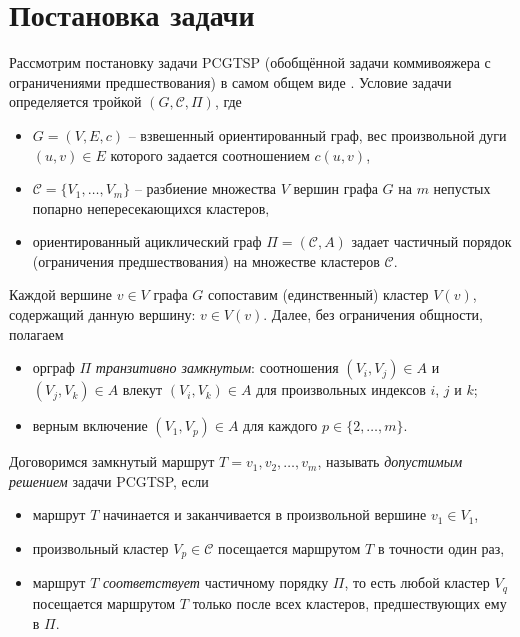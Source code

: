 
\section*{Постановка задачи}
\label{sec:pcgtsp-stmt}

Рассмотрим постановку задачи PCGTSP
(обобщённой задачи коммивояжера с ограничениями предшествования)
в самом общем виде
\cite{bi:pcgtsp2021}.
Условие задачи определяется тройкой
$(G,\mathcal C,\Pi)$,
где
\begin{itemize}
  \item
	$G=(V,E,c)$
  -- взвешенный ориентированный граф,
  вес произвольной дуги $(u,v)\in E$
  которого задается соотношением
  $c(u,v)$,
  \item
	$\mathcal C=\{V_1,\ldots,V_m\}$
  -- разбиение множества $V$
  вершин графа $G$ на $m$
  непустых попарно непересекающихся кластеров,
  \item
	ориентированный ациклический граф
  $ \Pi = (\mathcal C, A) $
  задает частичный порядок
  (ограничения предшествования)
  на множестве кластеров
  $\mathcal C$.
\end{itemize}

Каждой вершине
$v\in V$
графа $G$
сопоставим
(единственный)
кластер
$V(v)$,
содержащий данную вершину:
$v\in V(v)$.
Далее, без ограничения общности, полагаем
\begin{itemize}
  \item
  орграф $\Pi$
  \textit{транзитивно замкнутым}:
  соотношения $(V_i,V_j)\in A$ и $(V_j,V_k)\in A$
  влекут $(V_i,V_k)\in A$
  для произвольных индексов $i$, $j$ и $k$;
  \item
  верным включение
  $(V_1,V_p)\in A$
  для каждого
  $p\in\{2,\ldots,m\}$.
\end{itemize}

Договоримся замкнутый маршрут
$T=v_1, v_2, \ldots, v_m$,
называть \textit{допустимым решением} задачи PCGTSP,
если
\begin{itemize}
  \item
  маршрут $T$ начинается и заканчивается в произвольной вершине
  $v_1\in V_1$,
  \item
  произвольный кластер
  $V_p\in\mathcal C$
  посещается маршрутом $T$ в точности один раз,
  \item
  маршрут $T$ \textit{соответствует} частичному порядку
  $\Pi$,
  то есть любой кластер $V_q$
  посещается маршрутом $T$
  только после всех кластеров,
  предшествующих ему в $\Pi$.
\end{itemize}

